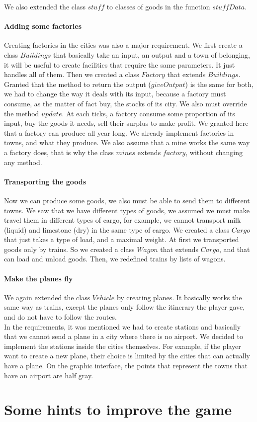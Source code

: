\documentclass[a4paper]{article}
\begin{document}
	We also extended the class $stuff$ to classes of goods in the function $ stuffData$. 
	
	\paragraph{Adding some factories}
	Creating factories in the cities was also a major requirement. We first create a class $Buildings$ that basically take an input, an output and a town of belonging, it will be useful to create facilities that require the same parameters. It just handles all of them. Then we created a class $Factory$ that extends $Buildings$. Granted that the method to return the output ($giveOutput$) is the same for both, we had to change the way it deals with its input, because a factory must consume, as the matter of fact buy, the stocks of its city. We also must override the method $update$. At each ticks, a factory consume some proportion of its input, buy the goods it needs, sell their surplus to make profit. We granted here that a factory can produce all year long. We already implement factories in towns, and what they produce.
	 We also assume that a mine works the same way a factory does, that is why the class $mines$ extends $factory$, without changing any method. 
	
	\paragraph{Transporting the goods}
	Now we can produce some goods, we also must be able to send them to different towns. We saw that we have different types of goods, we assumed we must make travel them in different types of cargo, for example, we cannot transport milk (liquid) and limestone (dry) in the same type of cargo. We created a class $Cargo$ that just takes a type of load, and a maximal weight. At first we transported goods only by trains. So we created a class $Wagon$ that extends $Cargo$, and that can load and unload goods. Then, we redefined trains by lists of wagons. 
	
	\paragraph{Make the planes fly}
	We again extended the class $Vehicle$ by creating planes. It basically works the same way as trains, except the planes only follow the itinerary the player gave, and do not have to follow the routes.\\
	In the requirements, it was mentioned we had to create stations and basically that we cannot send a plane in a city where there is no airport. We decided to implement the stations inside the cities themselves. For example, if the player want to create a new plane, their choice is limited by the cities that can actually have a plane. On the graphic interface, the points that represent the towns that have an airport are half gray.\\
	
	
	\section{Some hints to improve the game}
	
\end{document}
